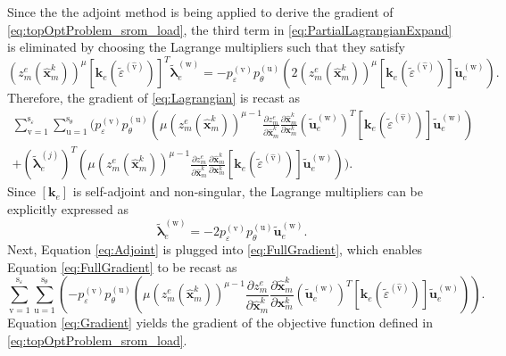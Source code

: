Since the the adjoint method is being applied to derive the gradient of \eqref{eq:topOptProblem_srom_load}, the third term in \eqref{eq:PartialLagrangianExpand} is eliminated by choosing the Lagrange multipliers such that they satisfy
\begin{equation}
\label{eq:AdjointSystem}
(z_m^e(\hat{\bm x}_m^k))^\mu [ \bm k_e(\tilde\varepsilon^{(\hat{\mathrm{v}})}) ]^{T} \tilde{\bm\lambda}_e^{(\mathrm{w})} = -p_{\varepsilon}^{(\mathrm{v})}p_{\theta}^{(\mathrm{u})} \left( 2(z_m^e(\hat{\bm x}_m^k))^\mu [ \bm k_e (\tilde\varepsilon^{(\hat{\mathrm{v}})}) ] \tilde{\bm u}_e^{(\mathrm{w})} \right).
\end{equation}
Therefore, the gradient of \eqref{eq:Lagrangian} is recast as
\begin{equation}
\label{eq:FullGradient}
\begin{aligned}
\sum_{\mathrm{v}=1}^{\mathrm{s}_{\varepsilon}} \sum_{\mathrm{u}=1}^{\mathrm{s}_{\theta}} \Bigg( p_{\varepsilon}^{(\mathrm{v})}p_{\theta}^{(\mathrm{u})} \left( \mu(z_m^e(\hat{\bm{x}}_m^k) )^{\mu-1} \frac{\partial z_m^e}{\partial\hat{\bm x}_m^k}\frac{\partial\hat{\bm x}_m^k}{\partial\bm x_m^k}(\tilde{\bm u}^{(\mathrm{w})}_{e})^{T} [ \bm{k}_e(\tilde\varepsilon^{(\hat{\mathrm{v}})}) ] \tilde{\bm u}_{e}^{(\mathrm{w})}\right) 
\\
+ (\tilde{\bm\lambda}_e^{(j)})^{T}\left(\mu(z_m^e(\hat{\bm x}_m^k))^{\mu-1}\frac{\partial z_m^e}{\partial\hat{\bm x}_m^k} \frac{\partial\hat{\bm x}_m^k}{\partial\bm x_m^k} [ \bm{k}_e(\tilde\varepsilon^{(\hat{\mathrm{v}})}) ] \tilde{\bm u}_e^{(\mathrm{w})}\right)\Bigg).
\end{aligned}
\end{equation}
Since $[\bm k_e]$ is self-adjoint and non-singular, the Lagrange multipliers can be explicitly expressed as 
\begin{equation}
\label{eq:Adjoint}
\tilde{\bm \lambda}_e^{(\mathrm{w})}=-2p_{\varepsilon}^{(\mathrm{v})}p_{\theta}^{(\mathrm{u})}\tilde{\bm u}_e^{(\mathrm{w})}.
\end{equation}
Next, Equation \eqref{eq:Adjoint} is plugged into \eqref{eq:FullGradient}, which enables Equation \eqref{eq:FullGradient} to be recast as 
\begin{equation}
\label{eq:Gradient}
\sum_{\mathrm{v}=1}^{\mathrm{s}_{\varepsilon}} \sum_{\mathrm{u}=1}^{\mathrm{s}_{\theta}}  \left(-p_{\varepsilon}^{(\mathrm{v})}p_{\theta}^{(\mathrm{u})} \left(\mu(z_m^e(\hat{\bm{x}}_m^{k}))^{\mu-1}\frac{\partial z_m^e}{\partial\hat{\bm x}_m^k}\frac{\partial\hat{\bm x}_m^k}{\partial\bm x_m^k}(\tilde{\bm u}^{(\mathrm{w})}_{e})^{T} [ \bm{k}_e (\tilde\varepsilon^{(\hat{\mathrm{v}})}) ] \tilde{\bm u}_{e}^{(\mathrm{w})}\right)\right).
\end{equation}
Equation \eqref{eq:Gradient} yields the gradient of the objective function defined in \eqref{eq:topOptProblem_srom_load}.\\


